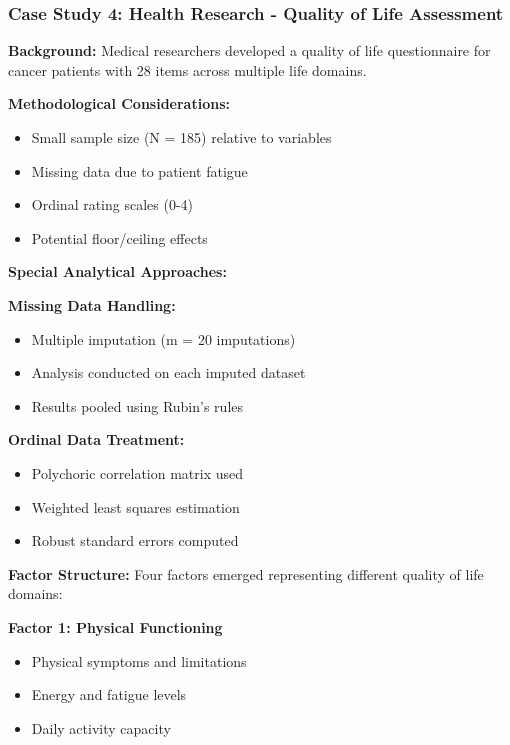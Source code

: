 \documentclass[
]{article}
\begin{document}
\subsubsection{Case Study 4: Health Research - Quality of Life
Assessment}

\textbf{Background:} Medical researchers developed a quality of life
questionnaire for cancer patients with 28 items across multiple life
domains.

\textbf{Methodological Considerations:}

\begin{itemize}
\item
  Small sample size (N = 185) relative to variables
\item
  Missing data due to patient fatigue
\item
  Ordinal rating scales (0-4)
\item
  Potential floor/ceiling effects
\end{itemize}

\textbf{Special Analytical Approaches:}

\textbf{Missing Data Handling:}

\begin{itemize}
\item
  Multiple imputation (m = 20 imputations)
\item
  Analysis conducted on each imputed dataset
\item
  Results pooled using Rubin's rules
\end{itemize}

\textbf{Ordinal Data Treatment:}

\begin{itemize}
\item
  Polychoric correlation matrix used
\item
  Weighted least squares estimation
\item
  Robust standard errors computed
\end{itemize}

\textbf{Factor Structure:} Four factors emerged representing different
quality of life domains:

\textbf{Factor 1: Physical Functioning}

\begin{itemize}
\item
  Physical symptoms and limitations
\item
  Energy and fatigue levels
\item
  Daily activity capacity
\end{itemize}
\end{document}
